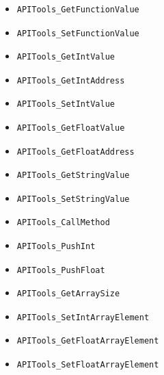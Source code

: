 \documentclass[11pt]{article}
\begin{document}
\begin{itemize}
\item \begin{verbatim}APITools_GetFunctionValue\end{verbatim}
\item \begin{verbatim}APITools_SetFunctionValue\end{verbatim}
\item \begin{verbatim}APITools_GetIntValue\end{verbatim}
\item \begin{verbatim}APITools_GetIntAddress\end{verbatim}
\item \begin{verbatim}APITools_SetIntValue\end{verbatim}
\item \begin{verbatim}APITools_GetFloatValue\end{verbatim}
\item \begin{verbatim}APITools_GetFloatAddress\end{verbatim}
\item \begin{verbatim}APITools_GetStringValue\end{verbatim}
\item \begin{verbatim}APITools_SetStringValue\end{verbatim}
\item \begin{verbatim}APITools_CallMethod\end{verbatim}
\item \begin{verbatim}APITools_PushInt\end{verbatim}
\item \begin{verbatim}APITools_PushFloat\end{verbatim}
\item \begin{verbatim}APITools_GetArraySize\end{verbatim}
\item \begin{verbatim}APITools_SetIntArrayElement\end{verbatim}
\item \begin{verbatim}APITools_GetFloatArrayElement\end{verbatim}
\item \begin{verbatim}APITools_SetFloatArrayElement\end{verbatim}
\end{itemize}
\end{document}
